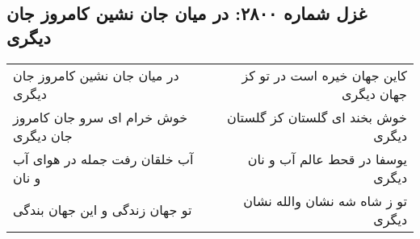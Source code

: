 \begin{center}
\section*{غزل شماره ۲۸۰۰: در میان جان نشین کامروز جان دیگری}
\label{sec:2800}
\begin{longtable}{l p{0.5cm} r}
در میان جان نشین کامروز جان دیگری
&&
کاین جهان خیره است در تو کز جهان دیگری
\\
خوش خرام ای سرو جان کامروز جان دیگری
&&
خوش بخند ای گلستان کز گلستان دیگری
\\
آب خلقان رفت جمله در هوای آب و نان
&&
یوسفا در قحط عالم آب و نان دیگری
\\
تو جهان زندگی و این جهان بندگی
&&
تو ز شاه شه نشان والله نشان دیگری
\\
\end{longtable}
\end{center}
